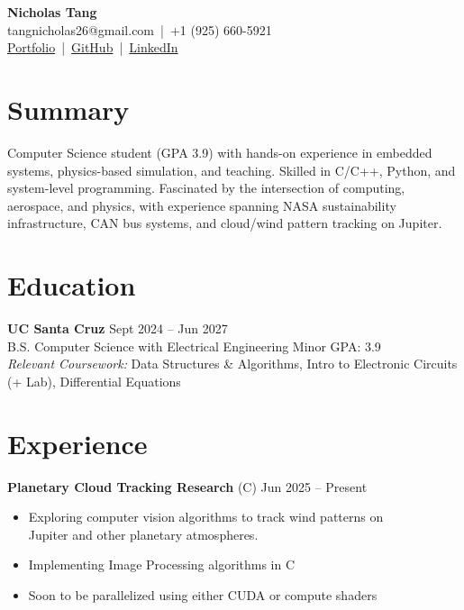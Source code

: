 \documentclass[a4paper,10pt]{article}
\begin{document}

\begin{center}
    {\LARGE \textbf{Nicholas Tang}} \\ [0.5em]
    tangnicholas26@gmail.com \,|\, +1 (925) 660-5921 \\ [0.3em]
    \href{https://nicholas-tangerine.github.io}{Portfolio} \,|\, 
    \href{https://github.com/nicholas-tangerine}{GitHub} \,|\, 
    \href{https://linkedin.com/in/nicholas-tangerine}{LinkedIn}
\end{center}

\section*{Summary}
Computer Science student (GPA 3.9) with hands-on experience in embedded
systems, physics-based simulation, and teaching. Skilled in C/C++, Python, and
system-level programming. Fascinated by the intersection of computing,
aerospace, and physics, with experience spanning NASA sustainability
infrastructure, CAN bus systems, and cloud/wind pattern tracking on Jupiter.

\section*{Education}
\textbf{UC Santa Cruz} \hfill Sept 2024 -- Jun 2027 \\
B.S. Computer Science with Electrical Engineering Minor \hfill GPA: 3.9 \\
\textit{Relevant Coursework:} Data Structures \& Algorithms, Intro to Electronic Circuits \\
(+ Lab), Differential Equations

\section*{Experience}
\textbf{Planetary Cloud Tracking Research} (C) \hfill Jun 2025 -- Present
\begin{itemize}
    \item Exploring computer vision algorithms to track wind patterns on \\
        Jupiter and other planetary atmospheres.
    \item Implementing Image Processing algorithms in C
    \item Soon to be parallelized using either CUDA or compute shaders
\end{itemize}
\end{document}
